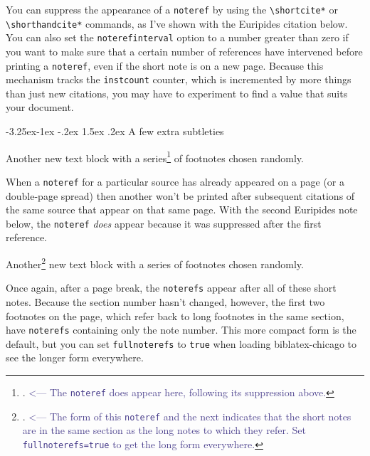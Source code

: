 \documentclass[a4paper,12pt]{article}
\makeatletter
\renewcommand{\section}{\@startsection{section}{1}{\z@}%
                                     {-3.25ex\@plus -1ex \@minus -.2ex}%
                                     {1.5ex \@plus .2ex}%
                                     {\normalfont\large\bfseries}}
\newcommand{\cmd}[1]{\texttt{\textbackslash #1}}
\newcommand{\mylittlespace}{\vspace{5pt}}%
\makeatother
\begin{document}
\mylittlespace You can suppress the appearance of a \texttt{noteref}
by using the \cmd{shortcite*} or \cmd{shorthandcite*} commands, as
I've shown with the Euripides citation below.  You can also set the
\texttt{noterefin\-terval} option to a number greater than zero if you
want to make sure that a certain number of references have intervened
before printing a \texttt{noteref}, even if the short note is on a new
page.  Because this mechanism tracks the \texttt{instcount} counter,
which is incremented by more things than just new citations, you may
have to experiment to find a value that suits your document.

\section{A few extra subtleties}
\label{sec:four}

Another\autocite{jackson:paulina:letter} new\autocite{holiday:fool}
text\autocite{garaud:gatine} block\autocite{leo:madonna}
with\autocite{schubert:muellerin} a\autocite{mchugh:wake}
series\footnote{\cite{euripides:orestes}.
  \textcolor{DarkSlateBlue}{<--- The \texttt{noteref} does appear
    here, following its suppression above.}}
of\autocite{clark:mesopot} footnotes\autocite{ashbrook:brain}
chosen\autocite{contrib:contrib} randomly.\autocite{frede:inproc}

\mylittlespace When a \texttt{noteref} for a particular source has
already appeared on a page (or a double-page spread) then another
won't be printed after subsequent citations of the same source that
appear on that same page.  With the second Euripides note below, the
\texttt{noteref} \emph{does} appear because it was suppressed after
the first reference.

\clearpage

Another\footnote{\cite{jackson:paulina:letter}.
  \textcolor{DarkSlateBlue}{<--- The form of this \texttt{noteref} and
    the next indicates that the short notes are in the same section as
    the long notes to which they refer. Set \texttt{fullnoterefs=true}
    to get the long form everywhere.}} new\autocite{holiday:fool}
text\autocite{garaud:gatine} block\autocite{leo:madonna}
with\autocite{schubert:muellerin} a\autocite{mchugh:wake}
series\autocite{euripides:orestes} of\autocite{clark:mesopot}
footnotes\autocite{ashbrook:brain} chosen\autocite{contrib:contrib}
randomly.\autocite{frede:inproc}

\mylittlespace Once again, after a page break, the \texttt{noterefs}
appear after all of these short notes.  Because the section number
hasn't changed, however, the first two footnotes on the page, which
refer back to long footnotes in the same section, have
\texttt{noterefs} containing only the note number.  This more
compact form is the default, but you can set \texttt{fullnoterefs} to
\texttt{true} when loading \textsf{biblatex-chicago} to see the longer
form everywhere.
\end{document}
